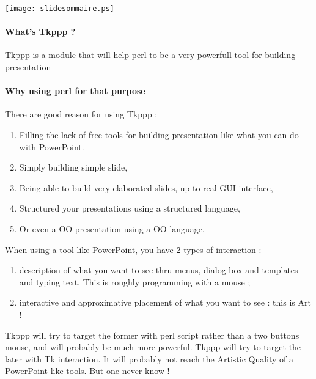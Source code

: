 \documentclass{article}
\begin{document}
\texttt{[image: slidesommaire.ps]}

\paragraph{What's Tkppp ?}

Tkppp is a module that will help perl to be a very
	  powerfull tool for building presentation

\paragraph{Why using perl for that purpose}

There are good reason for using Tkppp :

\begin{enumerate}

\item Filling the lack of free tools for building presentation like
what you can do with PowerPoint.

\item Simply building simple slide,

\item Being able to build very elaborated slides, up to real GUI
interface,

\item Structured your presentations using a structured language,

\item Or even a OO presentation using a OO language,

\end{enumerate}

When using a tool like PowerPoint, you have 2 types of interaction :

\begin{enumerate}

\item description of what you want to see thru menus, dialog box and
templates and typing text. This is roughly programming with a mouse ;

\item interactive and approximative placement of what you want to see
: this is Art !

\end{enumerate}

Tkppp will try to target the former with perl script rather than a
two buttons mouse, and will probably be much more powerful. Tkppp
will try to target the later with Tk interaction. It will probably not
reach the Artistic Quality of a PowerPoint like tools. But one never
know !
\end{document}
